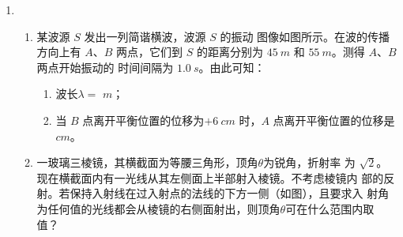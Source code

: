 \begin{enumerate}
\item 
{}
\begin{enumerate}
	\item
某波源 $ S $ 发出一列简谐横波，波源 $ S $ 的振动
图像如图所示。在波的传播方向上有 $ A $、$ B $ 两点，它们到
$ S $ 的距离分别为 $ 45 \ m $ 和 $ 55 \ m $。测得 $ A $、$ B $ 两点开始振动的
时间间隔为 $ 1.0 \ s $。由此可知：
\begin{figure}[h!]
	\centering
	
\end{figure}

\begin{enumerate}
	\item
波长$ \lambda = $ \underlinegap $ m $；
\item 
当 $ B $ 点离开平衡位置的位移为$ +6 \ cm $ 时，$ A $ 点离开平衡位置的位移是 \underlinegap $ cm $。

\end{enumerate}



\item 
一玻璃三棱镜，其横截面为等腰三角形，顶角$ \theta $为锐角，折射率
为 $ \sqrt{2} $。现在横截面内有一光线从其左侧面上半部射入棱镜。不考虑棱镜内
部的反射。若保持入射线在过入射点的法线的下方一侧（如图），且要求入
射角为任何值的光线都会从棱镜的右侧面射出，则顶角$ \theta $可在什么范围内取
值？
\begin{figure}[h!]
	\flushright
	
\end{figure}


\end{enumerate}
\end{enumerate}
